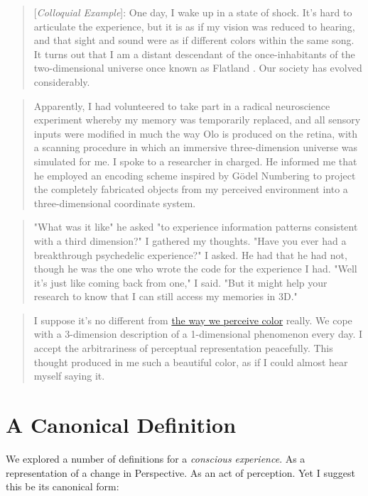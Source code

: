 \documentclass[runningheads]{llncs}
\newcommand{\lib}[2]{\href{https://dna-platform.github.io/inexplicable-phenomena#1}{#2}\xspace}
\begin{document}
\begin{quote}
[\emph{Colloquial Example}]: One day, I wake up in a state of shock. It's hard to articulate the experience, but it is as if my vision was reduced to hearing, and that sight and sound were as if different colors within the same song. It turns out that I am a distant descendant of the once-inhabitants of the two-dimensional universe once known as Flatland \cite{Flatland1884}. Our society has evolved considerably.
\end{quote}

\begin{quote}
Apparently, I had volunteered to take part in a radical neuroscience experiment whereby my memory was temporarily replaced, and all sensory inputs were modified in much the way Olo is produced on the retina, with a scanning procedure in which an immersive three-dimension universe was simulated for me. I spoke to a researcher in charged. He informed me that he employed an encoding scheme inspired by Gödel Numbering to project the completely fabricated objects from my perceived environment into a three-dimensional coordinate system.
\end{quote}

\begin{quote}
"What was it like" he asked "to experience information patterns consistent with a third dimension?" I gathered my thoughts. "Have you ever had a breakthrough psychedelic experience?" I asked. He had that he had not, though he was the one who wrote the code for the experience I had. "Well it's just like coming back from one," I said. "But it might help your research to know that I can still access my memories in 3D."
\end{quote}

\begin{quote}
I suppose it's no different from \lib{/a-novel-perspective/a-novel-perspective.html}{the way we perceive color} really. We cope with a 3-dimension description of a 1-dimensional phenomenon every day. I accept the arbitrariness of perceptual representation peacefully. This thought produced in me such a beautiful color, as if I could almost hear myself saying it.
\end{quote}

\section{A Canonical Definition}

We explored a number of definitions for a \emph{conscious experience}. As a representation of a change in Perspective. As an act of perception. Yet I suggest this be its canonical form:
\end{document}
